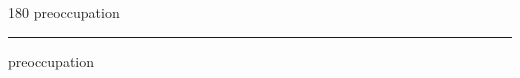 
\begin{frame}
\begin{center}
\begin{turn}{180}
{\fontsize{2.5cm}{1em}\selectfont preoccupation}
\end{turn}
\vspace{1em}\par  
\hrule
\vspace{1em}\par  
{\fontsize{2.5cm}{1em}\selectfont preoccupation}
\end{center}
\end{frame}
